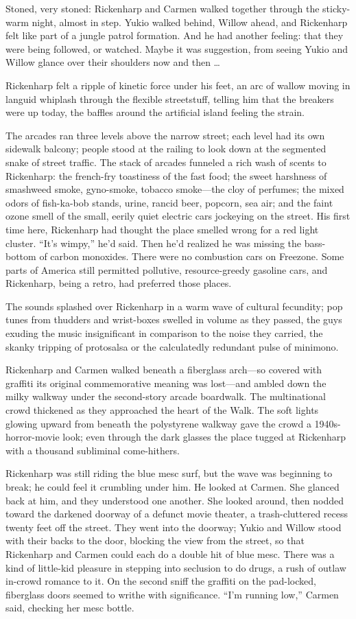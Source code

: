 Stoned, very stoned: Rickenharp and Carmen walked together through the sticky-warm night, almost in step. Yukio walked behind, Willow ahead, and Rickenharp felt like part of a jungle patrol formation. And he had another feeling: that they were being followed, or watched. Maybe it was suggestion, from seeing Yukio and Willow glance over their shoulders now and then …

Rickenharp felt a ripple of kinetic force under his feet, an arc of wallow moving in languid whiplash through the flexible streetstuff, telling him that the breakers were up today, the baffles around the artificial island feeling the strain.

The arcades ran three levels above the narrow street; each level had its own sidewalk balcony; people stood at the railing to look down at the segmented snake of street traffic. The stack of arcades funneled a rich wash of scents to Rickenharp: the french-fry toastiness of the fast food; the sweet harshness of smashweed smoke, gyno-smoke, tobacco smoke—the cloy of perfumes; the mixed odors of fish-ka-bob stands, urine, rancid beer, popcorn, sea air; and the faint ozone smell of the small, eerily quiet electric cars jockeying on the street. His first time here, Rickenharp had thought the place smelled wrong for a red light cluster. “It’s wimpy,” he’d said. Then he’d realized he was missing the bass-bottom of carbon monoxides. There were no combustion cars on Freezone. Some parts of America still permitted pollutive, resource-greedy gasoline cars, and Rickenharp, being a retro, had preferred those places.

The sounds splashed over Rickenharp in a warm wave of cultural fecundity; pop tunes from thudders and wrist-boxes swelled in volume as they passed, the guys exuding the music insignificant in comparison to the noise they carried, the skanky tripping of protosalsa or the calculatedly redundant pulse of minimono.

Rickenharp and Carmen walked beneath a fiberglass arch—so covered with graffiti its original commemorative meaning was lost—and ambled down the milky walkway under the second-story arcade boardwalk. The multinational crowd thickened as they approached the heart of the Walk. The soft lights glowing upward from beneath the polystyrene walkway gave the crowd a 1940s-horror-movie look; even through the dark glasses the place tugged at Rickenharp with a thousand subliminal come-hithers.

Rickenharp was still riding the blue mesc surf, but the wave was beginning to break; he could feel it crumbling under him. He looked at Carmen. She glanced back at him, and they understood one another. She looked around, then nodded toward the darkened doorway of a defunct movie theater, a trash-cluttered recess twenty feet off the street. They went into the doorway; Yukio and Willow stood with their backs to the door, blocking the view from the street, so that Rickenharp and Carmen could each do a double hit of blue mesc. There was a kind of little-kid pleasure in stepping into seclusion to do drugs, a rush of outlaw in-crowd romance to it. On the second sniff the graffiti on the pad-locked, fiberglass doors seemed to writhe with significance. “I’m running low,” Carmen said, checking her mesc bottle.

